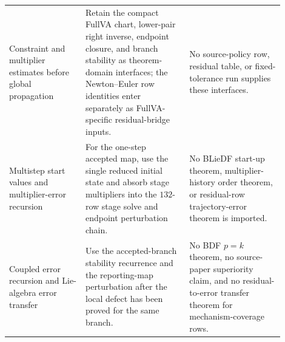 \documentclass[preprint,12pt]{elsarticle}
\begin{document}
\begin{table}[htbp]
\begin{tabular}{P{0.25\linewidth}P{0.34\linewidth}P{0.31\linewidth}}
Constraint and multiplier estimates before global propagation &
Retain the compact FullVA chart, lower-pair right inverse, endpoint closure,
and branch stability as theorem-domain interfaces; the Newton--Euler row
identities enter separately as FullVA-specific residual-bridge inputs. &
No source-policy row, residual table, or fixed-tolerance run supplies these
interfaces. \\
Multistep start values and multiplier-error recursion &
For the one-step accepted map, use the single reduced initial state and
absorb stage multipliers into the \(132\)-row stage solve and endpoint
perturbation chain. &
No BLieDF start-up theorem, multiplier-history order theorem, or residual-row
trajectory-error theorem is imported. \\
Coupled error recursion and Lie-algebra error transfer &
Use the accepted-branch stability recurrence and the reporting-map
perturbation after the local defect has been proved for the same branch. &
No BDF \(p=k\) theorem, no source-paper superiority claim, and no
residual-to-error transfer theorem for mechanism-coverage rows. \\
\bottomrule
\end{tabular}
\end{table}
\end{document}
